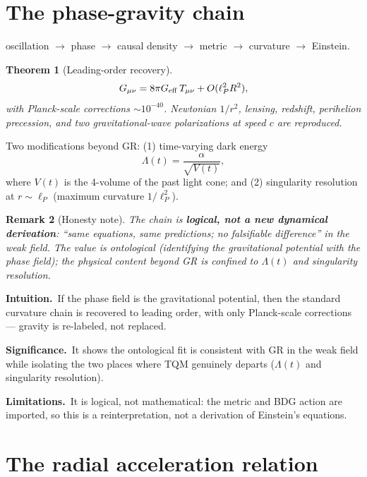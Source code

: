 \documentclass[10pt,twoside,openany]{book}
\newtheorem{theorem}{Theorem}[chapter]
\newtheorem{remark}[theorem]{Remark}
\newcommand{\theoremnotes}[3]{%
  \par\medskip\noindent
  \textbf{Intuition.}\ #1\par
  \textbf{Significance.}\ #2\par
  \textbf{Limitations.}\ #3\par}
\begin{document}
\section{The phase-gravity chain}

oscillation $\to$ phase $\to$ causal density $\to$ metric $\to$ curvature $\to$ Einstein.

\begin{theorem}[Leading-order recovery]
\begin{equation}
G_{\mu\nu} = 8\pi G_{\rm eff}\, T_{\mu\nu} + O(\ell_P^2 R^2),
\end{equation}
with Planck-scale corrections $\sim10^{-40}$. Newtonian $1/r^2$, lensing, redshift,
perihelion precession, and two gravitational-wave polarizations at speed $c$ are reproduced.
\end{theorem}

Two modifications beyond GR: (1) time-varying dark energy
\begin{equation}
\Lambda(t) = \frac{\alpha}{\sqrt{V(t)}},
\end{equation}
where $V(t)$ is the 4-volume of the past light cone; and (2) singularity resolution at
$r\sim\ell_P$ (maximum curvature $1/\ell_P^2$).

\begin{remark}[Honesty note]
The chain is \textbf{logical, not a new dynamical derivation}: ``same equations, same
predictions; no falsifiable difference'' in the weak field. The value is \emph{ontological}
(identifying the gravitational potential with the phase field); the physical content beyond
GR is confined to $\Lambda(t)$ and singularity resolution.
\end{remark}

\theoremnotes
{If the phase field is the gravitational potential, then the standard curvature chain is
recovered to leading order, with only Planck-scale corrections --- gravity is re-labeled,
not replaced.}
{It shows the ontological fit is consistent with GR in the weak field while isolating the
two places where TQM genuinely departs ($\Lambda(t)$ and singularity resolution).}
{It is logical, not mathematical: the metric and BDG action are imported, so this is a
reinterpretation, not a derivation of Einstein's equations.}

\section{The radial acceleration relation}
\end{document}
